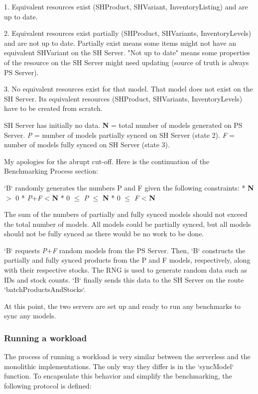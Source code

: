 1. Equivalent resources exist (SHProduct, SHVariant, InventoryListing) and are up to date.

2. Equivalent resources exist partially (SHProduct, SHVariants, InventoryLevels) and are not up to date. Partially exist means some items might not have an equivalent SHVariant on the SH Server. "Not up to date" means some properties of the resource on the SH Server might need updating (source of truth is always PS Server).

3. No equivalent resources exist for that model. That model does not exist on the SH Server. Its equivalent resources (SHProduct, SHVariants, InventoryLevels) have to be created from scratch.

SH Server has initially no data. \textbf{N} = total number of models generated on PS Server. \textit{P} = number of models partially synced on SH Server (state 2). \textit{F} = number of models fully synced on SH Server (state 3).

My apologies for the abrupt cut-off. Here is the continuation of the Benchmarking Process section:

`B` randomly generates the numbers P and F given the following constraints:
* \textbf{N} $>$ 0
* \textit{P}+\textit{F} < \textbf{N}
* 0 $\le$ \textit{P} $\le$ \textbf{N}
* 0 $\le$ \textit{F} < \textbf{N}

The sum of the numbers of partially and fully synced models should not exceed the total number of models. All models could be partially synced, but all models should not be fully synced as there would be no work to be done.

`B` requests \textit{P}+\textit{F} random models from the PS Server. Then, `B` constructs the partially and fully synced products from the P and F models, respectively, along with their respective stocks. The RNG is used to generate random data such as IDs and stock counts. `B` finally sends this data to the SH Server on the route `batchProductsAndStocks`.

At this point, the two servers are set up and ready to run any benchmarks to sync any models.

\subsubsection{Running a workload}

The process of running a workload is very similar between the serverless and the monolithic implementations. The only way they differ is in the `syncModel` function. To encapsulate this behavior and simplify the benchmarking, the following protocol is defined:

